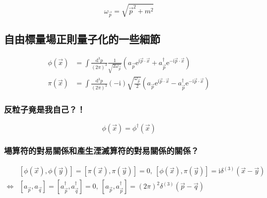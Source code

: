 \documentclass{article}
\begin{document}
$$\omega_{\vec{p}}=\sqrt{\vec{p}^2+m^2}$$

\subsection{自由標量場正則量子化的一些細節}

$$\begin{aligned}
    \phi(\vec{x}) & =\int\frac{\mathrm{d}^3p}{(2\pi)^3}\frac{1}{\sqrt{2\omega_{\vec{p}}}}(a_{\vec{p}}\mathrm{e}^{\mathrm{i}\vec{p}\cdot\vec{x}}+a_{\vec{p}}^{\dagger}\mathrm{e}^{-\mathrm{i}\vec{p}\cdot\vec{x}})             \\
    \pi(\vec{x})  & =\int\frac{\mathrm{d}^3p}{(2\pi)^3}(-\mathrm{i})\sqrt{\frac{\omega_{\vec{p}}}{2}}(a_{\vec{p}}\mathrm{e}^{\mathrm{i}\vec{p}\cdot\vec{x}}-a_{\vec{p}}^{\dagger}\mathrm{e}^{-\mathrm{i}\vec{p}\cdot\vec{x}})
  \end{aligned}$$

\subsubsection{反粒子竟是我自己？！}

$$\phi(\vec{x})=\phi^{\dagger}(\vec{x})$$

\subsubsection{場算符的對易關係和產生湮滅算符的對易關係的關係？}

$$\begin{aligned}
                    & [\phi(\vec{x}),\phi(\vec{y})]=[\pi(\vec{x}),\pi(\vec{y})]=0,\ [\phi(\vec{x}),\pi(\vec{y})]=\mathrm{i}\delta^{(3)}(\vec{x}-\vec{y})                    \\
    \Leftrightarrow & [a_{\vec{p}},a_{\vec{q}}]=[a_{\vec{p}}^{\dagger},a_{\vec{q}}^{\dagger}]=0,\ [a_{\vec{p}},a_{\vec{p}}^{\dagger}]=(2\pi)^2\delta^{(3)}(\vec{p}-\vec{q})
  \end{aligned}$$
\end{document}
